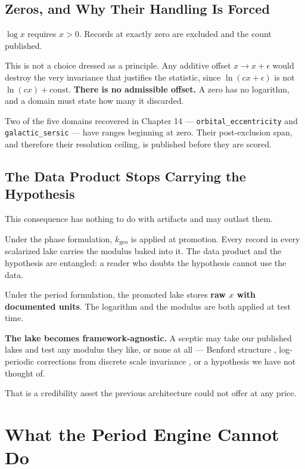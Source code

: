 \documentclass[11pt, letterpaper, openany]{book}
\newcommand{\kgeo}{k_{\mathrm{geo}}}
\begin{document}
\section{Zeros, and Why Their Handling Is Forced}

$\log x$ requires $x > 0$. Records at exactly zero are excluded and the count published.

This is not a choice dressed as a principle. Any additive offset $x \to x + \epsilon$ would
destroy the very invariance that justifies the statistic, since $\ln(cx + \epsilon)$ is not
$\ln(cx) + \text{const}$. \textbf{There is no admissible offset.} A zero has no logarithm, and a
domain must state how many it discarded.

Two of the five domains recovered in Chapter 14 --- \texttt{orbital\_eccentricity} and
\texttt{galactic\_sersic} --- have ranges beginning at zero. Their post-exclusion span, and
therefore their resolution ceiling, is published before they are scored.

\section{The Data Product Stops Carrying the Hypothesis}

This consequence has nothing to do with artifacts and may outlast them.

Under the phase formulation, $\kgeo$ is applied at promotion. Every record in every scalarized
lake carries the modulus baked into it. The data product and the hypothesis are entangled: a
reader who doubts the hypothesis cannot use the data.

Under the period formulation, the promoted lake stores \textbf{raw $x$ with documented units}.
The logarithm and the modulus are both applied at test time.

\begin{signalbox}
\textbf{The lake becomes framework-agnostic.} A sceptic may take our published lakes and test
any modulus they like, or none at all --- Benford structure \cite{benford1938, hill1995},
log-periodic corrections from discrete scale invariance \cite{sornette1998}, or a hypothesis we
have not thought of.

\medskip
\noindent That is a credibility asset the previous architecture could not offer at any price.
\end{signalbox}

\chapter{What the Period Engine Cannot Do}
\end{document}
